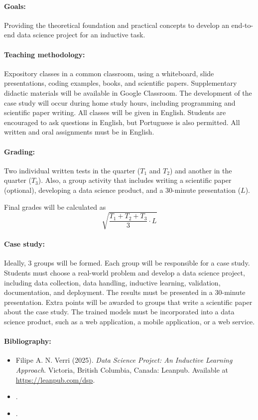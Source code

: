 \paragraph{Goals:}
Providing the theoretical foundation and practical concepts to develop an end-to-end
data science project for an inductive task.

\paragraph{Teaching methodology:}
Expository classes in a common classroom, using a whiteboard, slide presentations, coding
examples, books, and scientific papers.  Supplementary didactic materials will be available
in Google Classroom. The development of the case study will occur during home study
hours, including programming and scientific paper writing.  All classes will be given in
English.  Students are encouraged to ask questions in English, but Portuguese is also
permitted. All written and oral assignments must be in English.

\paragraph{Grading:} Two individual written tests in the  quarter ($T_1$ and $T_2$) and
another in the  quarter ($T_3$).  Also, a group activity that includes writing a
scientific paper (optional), developing a data science product, and a 30-minute presentation ($L$).

Final grades will be calculated as
\begin{equation*}
  \sqrt{\frac{T_1 + T_2 + T_3}{3} \cdot L}
\end{equation*}

\paragraph{Case study:} Ideally, 3 groups will be formed.  Each group will be responsible for
a case study.  Students must choose a real-world problem and develop a data science
project, including data collection, data handling, inductive learning, validation,
documentation, and deployment. The results must be presented in a 30-minute presentation.
Extra points will be awarded to groups that write a scientific paper about the case study.
The trained models must be incorporated into a data science product, such as a web
application, a mobile application, or a web service.

\paragraph{Bibliography:}
\begin{itemize}
  \itemsep 0pt
  \item Filipe A. N. Verri (2025).  \emph{Data Science Project: An Inductive Learning
    Approach}.  Victoria, British Columbia, Canada: Leanpub.  Available at
    \href{https://leanpub.com/dsp}{https://leanpub.com/dsp}.
  \item {}.
  \item {}.
\end{itemize}

